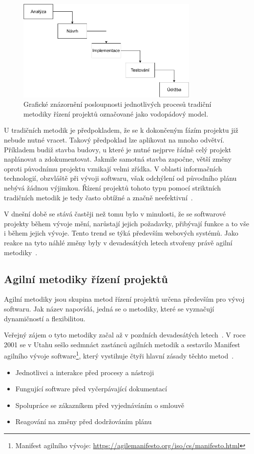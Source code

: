 \begin{figure}[H]
	\centering
	\includegraphics[width=0.8\textwidth]{obrazky-figures/waterfall-wide.pdf}
	\caption{Grafické znázornění posloupnosti jednotlivých procesů tradiční metodiky řízení projektů označované jako vodopádový model.}
	\label{img:waterfall}
\end{figure}

U tradičních metodik je předpokladem, že se k dokončeným fázím projektu již nebude nutné vracet. Takový předpoklad lze aplikovat na mnoho odvětví. Příkladem budiž stavba budovy, u které je nutné nejprve řádně celý projekt naplánovat a zdokumentovat. Jakmile samotná stavba započne, větší změny oproti původnímu projektu vznikají velmi zřídka. V oblasti informačních technologií, obzvláště při vývoji softwaru, však odchýlení od původního plánu nebývá žádnou výjimkou. Řízení projektů tohoto typu pomocí striktních tradičních metodik je tedy často obtížné a značně neefektivní~\cite{bib:agile-vs-traditional-what}.

V dnešní době se stává častěji než tomu bylo v minulosti, že se softwarové projekty během vývoje mění, narůstají jejich požadavky, přibývají funkce a to vše i během jejich vývoje. Tento trend se týká především webových systémů. Jako reakce na tyto náhlé změny byly v devadesátých letech stvořeny právě agilní metodiky~\cite{bib:agile-history}. 

\subsection{Agilní metodiky řízení projektů}
Agilní metodiky jsou skupina metod řízení projektů určena především pro vývoj softwaru. Jak název napovídá, jedná se o metodiky, které se vyznačují dynamičností a flexibilitou.

Veřejný zájem o tyto metodiky začal až v pozdních devadesátých letech~\cite{bib:agile-mobile}. V roce 2001 se v Utahu sešlo sedmnáct zastánců agilních metodik a sestavilo Manifest agilního vývoje software\footnote{ Manifest agilního vývoje: \url{https://agilemanifesto.org/iso/cs/manifesto.html}}, který vystihuje čtyři hlavní zásady těchto metod~\cite{bib:agile-manifest}.
\begin{itemize}
  \item Jednotlivci a interakce před procesy a nástroji
  \item Fungující software před vyčerpávající dokumentací
  \item Spolupráce se zákazníkem před vyjednáváním o smlouvě
  \item Reagování na změny před dodržováním plánu
\end{itemize}


